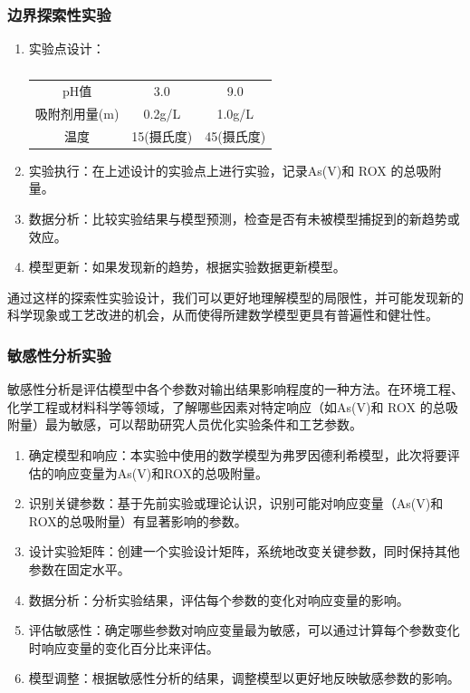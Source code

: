 \documentclass[AutoFakeBold]{ctexart}
\begin{document}
	\subsubsection{边界探索性实验}
	
	\begin{enumerate}
		\item 实验点设计：\\
		
			\begin{table}[H]
			\centering
			\begin{tabular}{ccc}
				\toprule
				pH值 &3.0 &9.0 \\
				
				吸附剂用量(m) &0.2g/L & 1.0g/L\\
				温度 &15(摄氏度) & 45(摄氏度) \\
				
				
				\bottomrule
			\end{tabular}
			\caption*{}
			\label{tab:example1}
		\end{table}
		
	
		
		\item 实验执行：在上述设计的实验点上进行实验，记录As(V)和 ROX 的总吸附 
		量。
		
		\item 数据分析：比较实验结果与模型预测，检查是否有未被模型捕捉到的新趋势或效应。
		\item 模型更新：如果发现新的趋势，根据实验数据更新模型。
		
		
	\end{enumerate}
	
	通过这样的探索性实验设计，我们可以更好地理解模型的局限性，并可能发现新的科学现象或工艺改进的机会，从而使得所建数学模型更具有普遍性和健壮性。
	
	\subsubsection{敏感性分析实验}
	
	敏感性分析是评估模型中各个参数对输出结果影响程度的一种方法。在环境工程、化学工程或材料科学等领域，了解哪些因素对特定响应（如As(V)和 ROX 的总吸附量）最为敏感，可以帮助研究人员优化实验条件和工艺参数。
	
		\begin{enumerate}
		\item 确定模型和响应：本实验中使用的数学模型为弗罗因德利希模型，此次将要评估的响应变量为As(V)和ROX的总吸附量。
		\item 识别关键参数：基于先前实验或理论认识，识别可能对响应变量（As(V)和ROX的总吸附量）有显著影响的参数。
		\item 设计实验矩阵：创建一个实验设计矩阵，系统地改变关键参数，同时保持其他参数在固定水平。
		\item 数据分析：分析实验结果，评估每个参数的变化对响应变量的影响。
		\item  评估敏感性：确定哪些参数对响应变量最为敏感，可以通过计算每个参数变化时响应变量的变化百分比来评估。
		\item  模型调整：根据敏感性分析的结果，调整模型以更好地反映敏感参数的影响。
	\end{enumerate}
	
\end{document}
